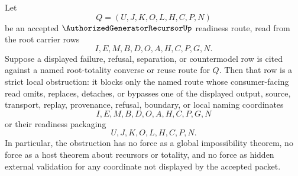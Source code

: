 \begin{corollary}
\label{cor:authorized-generator-recursor-root-totality-strict-obstruction}
Let
$$
Q=(U,J,K,O,L,H,C,P,N)
$$
be an accepted $\AuthorizedGeneratorRecursorUp$ readiness route, read from the root carrier rows
$$
I,E,M,B,D,O,A,H,C,P,G,N.
$$
Suppose a displayed failure, refusal, separation, or countermodel row is cited against a named root-totality converse or reuse route for $Q$. Then that row is a strict local obstruction: it blocks only the named route whose consumer-facing read omits, replaces, detaches, or bypasses one of the displayed output, source, transport, replay, provenance, refusal, boundary, or local naming coordinates
$$
I,E,M,B,D,O,A,H,C,P,G,N
$$
or their readiness packaging
$$
U,J,K,O,L,H,C,P,N.
$$
In particular, the obstruction has no force as a global impossibility theorem, no force as a host theorem about recursors or totality, and no force as hidden external validation for any coordinate not displayed by the accepted packet.
\end{corollary}
